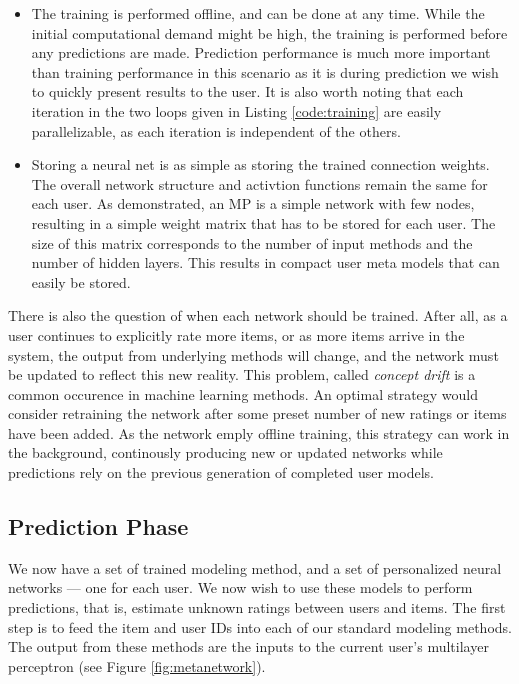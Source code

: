 \begin{itemize}
  \item 
    The training is performed offline, and can be done at any time.
    While the initial computational demand might be high,
    the training is performed before any predictions are made.
    Prediction performance is much more important than training performance
    in this scenario as it is during prediction we wish to quickly 
    present results to the user.
    It is also worth noting that each iteration in the two loops given in Listing \ref{code:training}
    are easily parallelizable, as each iteration is independent of the others.
  \item
    Storing a neural net is as simple as storing the trained connection weights.
    The overall network structure and activtion functions remain the same for each user.
    As demonstrated, an MP is a simple network with few nodes, resulting
    in a simple weight matrix that has to be stored for each user.
    The size of this matrix corresponds to the number of input methods
    and the number of hidden layers.
    This results in compact user meta models that can easily be stored.
\end{itemize}

There is also the question of when each network should be trained.
After all, as a user continues to explicitly rate more items,
or as more items arrive in the system, the output from underlying methods
will change, and the network must be updated to reflect this new reality.
This problem, called \emph{concept drift} is a common occurence in machine learning methods.
An optimal strategy would consider retraining the network after some preset number
of new ratings or items have been added. As the network emply offline training,
this strategy can work in the background, continously producing new or updated networks
while predictions rely on the previous generation of completed user models.


\subsection{Prediction Phase}

We now have a set of trained modeling method, and a set of personalized neural networks --- one for each user.
We now wish to use these models to perform predictions, that is, estimate unknown ratings between users and items.
The first step is to feed the item and user IDs into each of our standard modeling methods.
The output from these methods are the inputs to the current user's multilayer perceptron
(see Figure \ref{fig:metanetwork}).

